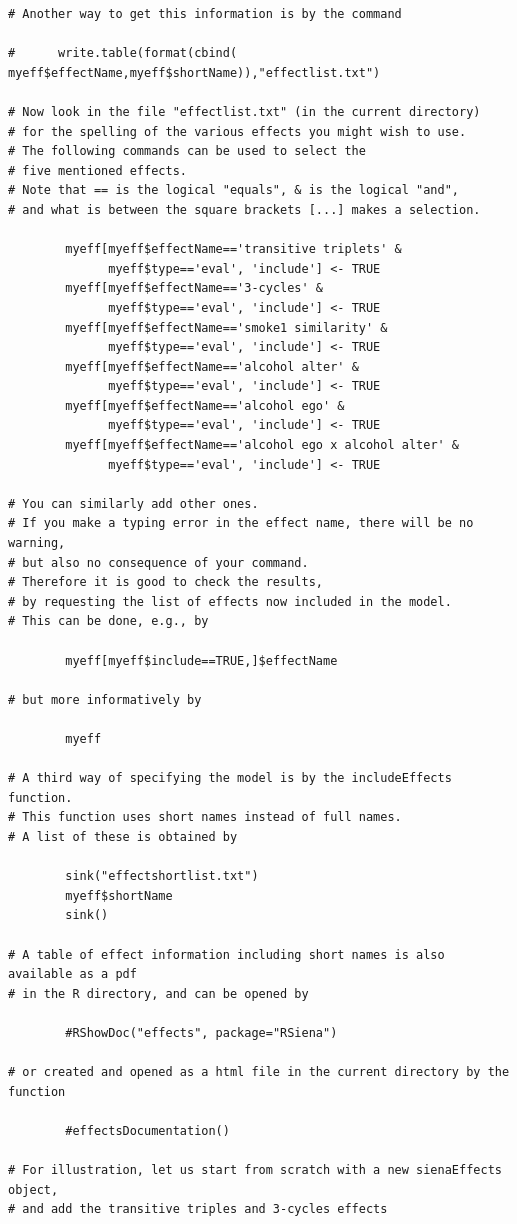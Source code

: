 \documentclass[a4paper,fleqn]{article}
\newcommand{\+}{\, + \,}
\begin{document}
{\begin{verbatim}
# Another way to get this information is by the command

#      write.table(format(cbind( myeff$effectName,myeff$shortName)),"effectlist.txt")

# Now look in the file "effectlist.txt" (in the current directory)
# for the spelling of the various effects you might wish to use.
# The following commands can be used to select the
# five mentioned effects.
# Note that == is the logical "equals", & is the logical "and",
# and what is between the square brackets [...] makes a selection.

        myeff[myeff$effectName=='transitive triplets' &
              myeff$type=='eval', 'include'] <- TRUE
        myeff[myeff$effectName=='3-cycles' &
              myeff$type=='eval', 'include'] <- TRUE
        myeff[myeff$effectName=='smoke1 similarity' &
              myeff$type=='eval', 'include'] <- TRUE
        myeff[myeff$effectName=='alcohol alter' &
              myeff$type=='eval', 'include'] <- TRUE
        myeff[myeff$effectName=='alcohol ego' &
              myeff$type=='eval', 'include'] <- TRUE
        myeff[myeff$effectName=='alcohol ego x alcohol alter' &
              myeff$type=='eval', 'include'] <- TRUE

# You can similarly add other ones.
# If you make a typing error in the effect name, there will be no warning,
# but also no consequence of your command.
# Therefore it is good to check the results,
# by requesting the list of effects now included in the model.
# This can be done, e.g., by

        myeff[myeff$include==TRUE,]$effectName

# but more informatively by

        myeff

# A third way of specifying the model is by the includeEffects function.
# This function uses short names instead of full names.
# A list of these is obtained by

        sink("effectshortlist.txt")
        myeff$shortName
        sink()

# A table of effect information including short names is also available as a pdf
# in the R directory, and can be opened by

        #RShowDoc("effects", package="RSiena")

# or created and opened as a html file in the current directory by the function

        #effectsDocumentation()

# For illustration, let us start from scratch with a new sienaEffects object,
# and add the transitive triples and 3-cycles effects


\end{verbatim}}
\end{document}
